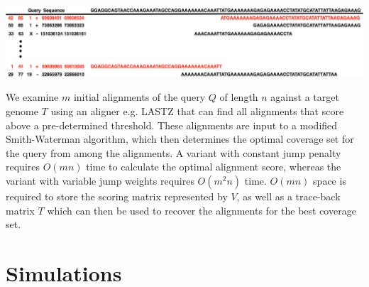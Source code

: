 \documentclass[a0,final]{a0poster}
\begin{document}
\begin{multicols}{3}
\includegraphics[scale = 0.46]{motivation/motivation2.png}
\vspace{10mm}

We examine $m$ initial alignments of the query $Q$ of length $n$ against a
target genome $T$ using an aligner e.g. LASTZ \cite{rsharris} that can find all 
alignments that score above a pre-determined threshold. These alignments are
input to a modified Smith-Waterman algorithm, which then determines the optimal
coverage set for the query from among the alignments. A variant with constant 
jump penalty requires $O(mn)$  time to calculate the optimal alignment score, 
whereas the variant with variable jump weights requires $O(m^2n)$ time. 
$O(mn)$ space is required to store the  scoring matrix represented by $V$, 
as well as a trace-back matrix $T$ which can  then be used to recover the 
alignments for the best coverage set. 

\section*{Simulations}


\end{multicols}
\end{document}
